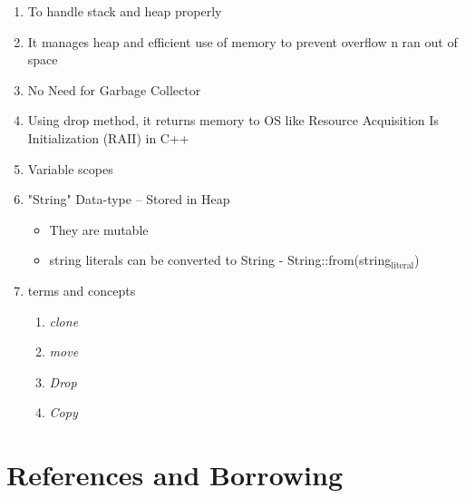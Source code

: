 \documentclass[11pt]{article}
\begin{document}
\begin{enumerate}
\item To handle stack and heap properly

\item It manages heap and efficient use of memory to prevent overflow n ran out of space

\item No Need for Garbage Collector

\item Using drop method, it returns memory to OS like Resource Acquisition Is Initialization (RAII) in C++

\item Variable scopes

\item "String" Data-type -- Stored in Heap

\begin{itemize}
\item They are mutable

\item string literals can be converted to String - String::from(string$_{\text{literal}}$)
\end{itemize}

\item terms and concepts
\begin{enumerate}
\item \emph{clone}
\item \emph{move}
\item \emph{Drop}
\item \emph{Copy}
\end{enumerate}
\end{enumerate}


\section{References and Borrowing}
\label{sec-6}
\end{document}
